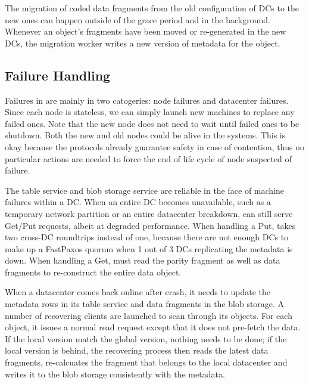 The migration of coded data fragments from the old configuration of DCs to the
new ones can happen outside of the grace period and in the background. Whenever 
an object's fragments have been moved or re-generated in the new DCs, the migration worker 
writes a new version of metadata for the object.


\subsection{Failure Handling}

Failures in {\name} are mainly in two catogeries: {\name} node failures and
datacenter failures. Since each \name node is stateless, 
we can simply launch new machines to replace any failed ones.
Note that the new node does not need to wait until
failed ones to be shutdown.  Both the new and old nodes could be
alive in the systems. This is okay because the {\name} protocols already
guarantee safety in case of contention, thus no particular actions are needed
to force the end of life cycle of node suspected of failure.

The table service and blob storage service are reliable in the face of machine
failures within a DC.  When an entire DC becomes unavailable, such as a
temporary network partition or an entire datacenter breakdown, {\name} can
still serve Get/Put requests, albeit at degraded performance. When handling a Put, 
\name takes two cross-DC roundtrips instead of one,
because there are not enough DCs to make up a FastPaxos quorum when 1 out of 3 DCs
replicating the metadata is down.  When handling a Get, \name must read the parity 
fragment as well as data fragments to re-construct the entire data object.

When a datacenter comes back online after crash, it needs to update the
metadata rows in its table service and data fragments in the blob storage.
A number of recovering clients are launched to scan through its objects.
For each object, it issues a normal read request except that it does not
pre-fetch the data. If the local version match the global version, nothing
needs to be done; if the local version is behind, the recovering process
then reads the latest data fragments, re-calcuates the fragment that belongs
to the local datacenter and writes it to the blob storage consistently with
the metadata.




